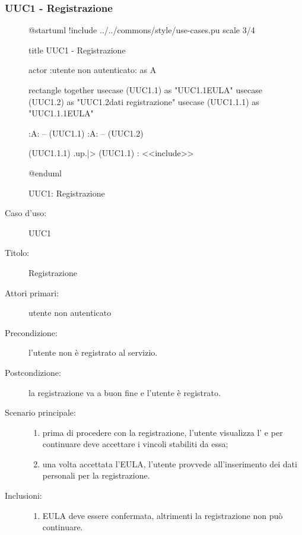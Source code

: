 \documentclass[casi-duso]{subfiles}
\begin{document}
\subsubsection{UUC1 - Registrazione}%
\label{subsub:UUC1utente}

\begin{figure}[h!]
  \centering
  \begin{plantuml}
  @startuml
  !include ../../commons/style/use-cases.pu
  scale 3/4

  title UUC1 - Registrazione

  actor :utente non autenticato: as A

  rectangle {
    together {
      usecase (UUC1.1) as "UUC1.1\nVisualizzazione EULA"
      usecase (UUC1.2) as "UUC1.2\nInserimento dati registrazione"
      usecase (UUC1.1.1) as "UUC1.1.1\nConferma EULA"
    }
  }

  :A: -- (UUC1.1)
  :A: -- (UUC1.2)

  (UUC1.1.1) .up.|> (UUC1.1) : <<include>>

  @enduml
  \end{plantuml} 
  \caption{UUC1: Registrazione}
  \label{fig:uuc1}
\end{figure}

\begin{description}
  \item[Caso d’uso:] UUC1
  \item[Titolo:] Registrazione
  \item[Attori primari:] utente non autenticato
  \item[Precondizione:] l'utente non è registrato al servizio.
  \item[Postcondizione:] la registrazione va a buon fine e l'utente è registrato.
  \item[Scenario principale:]
        \begin{enumerate}
          \item prima di procedere con la registrazione, l'utente visualizza l' e per continuare deve accettare i vincoli stabiliti da essa;
          \item una volta accettata l'EULA, l'utente provvede all'inserimento dei dati personali per la registrazione.
        \end{enumerate}
  \item[Inclusioni:]
        \begin{enumerate}
          \item EULA deve essere confermata, altrimenti la registrazione non può continuare.
        \end{enumerate}
\end{description}
\end{document}
